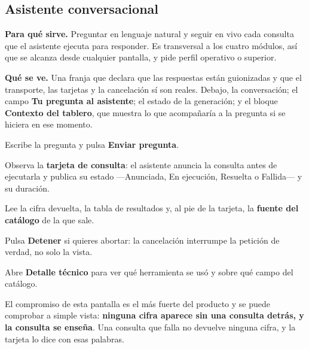 \clearpage
\subsection{Asistente conversacional}

\textbf{Para qué sirve.} Preguntar en lenguaje natural y seguir en vivo cada consulta que el
asistente ejecuta para responder. Es transversal a los cuatro módulos, así que se alcanza desde
cualquier pantalla, y pide perfil operativo o superior.

\textbf{Qué se ve.} Una franja que declara que las respuestas están guionizadas y que el
transporte, las tarjetas y la cancelación sí son reales. Debajo, la conversación; el campo
\textbf{Tu pregunta al asistente}; el estado de la generación; y el bloque \textbf{Contexto del
tablero}, que muestra lo que acompañaría a la pregunta si se hiciera en ese momento.


\begin{uxpreg}
  \item Escribe la pregunta y pulsa \textbf{Enviar pregunta}.
  \item Observa la \textbf{tarjeta de consulta}: el asistente anuncia la consulta antes de
    ejecutarla y publica su estado ---Anunciada, En ejecución, Resuelta o Fallida--- y su
    duración.
  \item Lee la cifra devuelta, la tabla de resultados y, al pie de la tarjeta, la
    \textbf{fuente del catálogo} de la que sale.
  \item Pulsa \textbf{Detener} si quieres abortar: la cancelación interrumpe la petición de
    verdad, no solo la vista.
  \item Abre \textbf{Detalle técnico} para ver qué herramienta se usó y sobre qué campo del
    catálogo.
\end{uxpreg}

El compromiso de esta pantalla es el más fuerte del producto y se puede comprobar a simple vista:
\textbf{ninguna cifra aparece sin una consulta detrás, y la consulta se enseña}. Una consulta que
falla no devuelve ninguna cifra, y la tarjeta lo dice con esas palabras.

